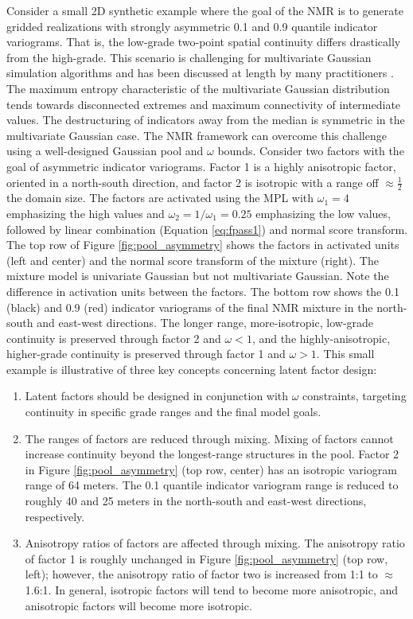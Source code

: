 Consider a small \gls{2D} synthetic example where the goal of the \gls{NMR} is to generate gridded realizations with strongly asymmetric 0.1 and 0.9 quantile indicator variograms. That is, the low-grade two-point spatial continuity differs drastically from the high-grade. This scenario is challenging for multivariate Gaussian simulation algorithms and has been discussed at length by many practitioners \citep{journel1983nonparametric, gomez-hernandez1998be, journel1993entropy,renard2011conditioning, guthke2013non}. The maximum entropy characteristic of the multivariate Gaussian distribution tends towards disconnected extremes and maximum connectivity of intermediate values. The destructuring of indicators away from the median is symmetric in the multivariate Gaussian case. The \gls{NMR} framework can overcome this challenge using a well-designed Gaussian pool and $\omega$ bounds. Consider two factors with the goal of asymmetric indicator variograms. Factor 1 is a highly anisotropic factor, oriented in a north-south direction, and factor 2 is isotropic with a range off $\approx \frac{1}{2}$ the domain size. The factors are activated using the \gls{MPL} with $\omega_{1}=4$ emphasizing the high values and $\omega_{2}=1/\omega_{1}=0.25$ emphasizing the low values, followed by linear combination (Equation \ref{eq:fpass1}) and normal score transform. The top row of Figure \ref{fig:pool_asymmetry} shows the factors in activated units (left and center) and the normal score transform of the mixture (right). The mixture model is univariate Gaussian but not multivariate Gaussian. Note the difference in activation units between the factors. The bottom row shows the 0.1 (black) and 0.9 (red) indicator variograms of the final \gls{NMR} mixture in the north-south and east-west directions. The longer range, more-isotropic, low-grade continuity is preserved through factor 2 and $\omega < 1$, and the highly-anisotropic, higher-grade continuity is preserved through factor 1 and $\omega > 1$. This small example is illustrative of three key concepts concerning latent factor design:
\begin{enumerate}[noitemsep]
    \item Latent factors should be designed in conjunction with $\omega$ constraints, targeting continuity in specific grade ranges and the final model goals.
    \item The ranges of factors are reduced through mixing. Mixing of factors cannot increase continuity beyond the longest-range structures in the pool. Factor 2 in Figure \ref{fig:pool_asymmetry} (top row, center) has an isotropic variogram range of 64 meters. The 0.1 quantile indicator variogram range is reduced to roughly 40 and 25 meters in the north-south and east-west directions, respectively.
    \item Anisotropy ratios of factors are affected through mixing. The anisotropy ratio of factor 1 is roughly unchanged in Figure \ref{fig:pool_asymmetry} (top row, left); however, the anisotropy ratio of factor two is increased from 1:1 to $\approx$ 1.6:1. In general, isotropic factors will tend to become more anisotropic, and anisotropic factors will become more isotropic.
\end{enumerate}

